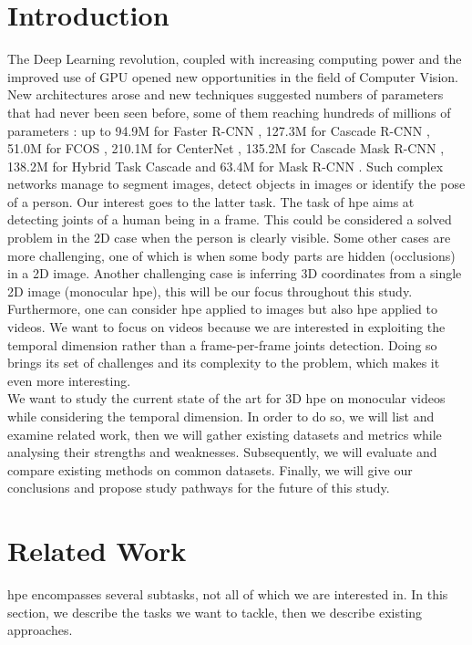\documentclass[runningheads]{llncs}
\begin{document}
\section{Introduction}
\label{section: introduction}
The Deep Learning revolution, coupled with increasing computing power and the improved use of GPU opened new opportunities in the field of Computer Vision. New architectures arose and new techniques suggested numbers of parameters that had never been seen before, some of them reaching hundreds of millions of parameters \cite{hrnet}: up to 94.9M for Faster R-CNN \cite{R-CNN}, 127.3M for Cascade R-CNN \cite{Cascade R-CNN}, 51.0M for FCOS \cite{FCOS}, 210.1M for CenterNet \cite{CenterNet}, 135.2M for Cascade Mask R-CNN \cite{Cascade R-CNN}, 138.2M for Hybrid Task Cascade \cite{Hybrid Task Cascade} and 63.4M for Mask R-CNN \cite{R-CNN}. Such complex networks manage to segment images, detect objects in images or identify the pose of a person. Our interest goes to the latter task. The task of \ac{hpe} aims at detecting joints of a human being in a frame. This could be considered a solved problem in the 2D case when the person is clearly visible. Some other cases are more challenging, one of which is when some body parts are hidden (occlusions) in a 2D image. Another challenging case is inferring 3D coordinates from a single 2D image (monocular \ac{hpe}), this will be our focus throughout this study. \\
Furthermore, one can consider \ac{hpe} applied to images but also \ac{hpe} applied to videos. We want to focus on videos because we are interested in exploiting the temporal dimension rather than a frame-per-frame joints detection. Doing so brings its set of challenges and its complexity to the problem, which makes it even more interesting. \\
We want to study the current state of the art for 3D \ac{hpe} on monocular videos while considering the temporal dimension. In order to do so, we will list and examine related work, then we will gather existing datasets and metrics while analysing their strengths and weaknesses. Subsequently, we will evaluate and compare existing methods on common datasets. Finally, we will give our conclusions and propose study pathways for the future of this study.

\section{Related Work}
\ac{hpe} encompasses several subtasks, not all of which we are interested in. In this section, we describe the tasks we want to tackle, then we describe existing approaches.
\end{document}
